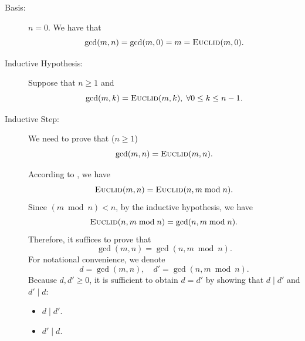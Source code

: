 \begin{description}
  \item[Basis:] $n = 0$. We have that
    \[
      \gcd(m,n) = \gcd(m,0) = m = \textsc{Euclid}(m,0).
    \]
  \item[Inductive Hypothesis:]
    Suppose that $n \ge 1$ and
    \[
      \gcd(m, k) = \textsc{Euclid}(m, k), \;\forall 0 \le k \le n - 1.
    \]
  \item[Inductive Step:]
    We need to prove that ($n \ge 1$)
    \[
      \gcd(m, n) = \textsc{Euclid}(m, n).
    \]

    According to \euclid{}, we have
    \[
      \textsc{Euclid}(m,n) = \textsc{Euclid}(n, m \bmod n).
    \]
    Since $(m \bmod n) < n$, by the inductive hypothesis, we have
    \[
      \textsc{Euclid}(n, m \bmod n) = \gcd(n, m \bmod n).
    \]
    Therefore, it suffices to prove that
    \[
      \boxed{\gcd(m,n) = \gcd(n, m \bmod n).}
    \]
    For notational convenience, we denote
    \[
      d = \gcd(m,n), \quad d' = \gcd(n, m \bmod n).
    \]
    Because $d, d' \ge 0$, it is sufficient to obtain $d = d'$
    by showing that $d \mid d'$ and $d' \mid d$:

    \begin{itemize}
      \item $d \mid d'$.
      \item $d' \mid d$.
    \end{itemize}
\end{description}
